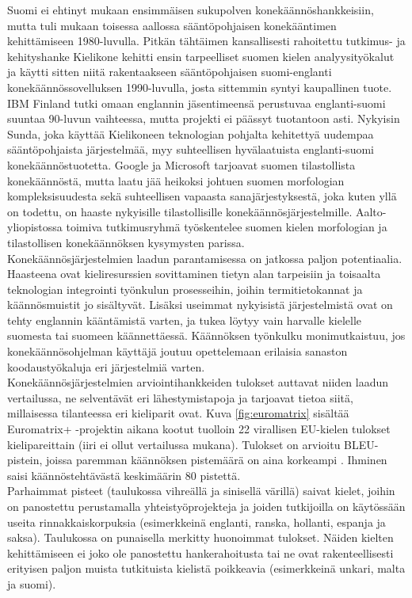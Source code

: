 \begin{multicols}{2}
Suomi ei ehtinyt mukaan ensimmäisen sukupolven konekäännöshankkeisiin,
mutta tuli mukaan toisessa aallossa sääntöpohjaisen konekääntimen
kehittämiseen 1980-luvulla. Pitkän tähtäimen kansallisesti rahoitettu
tutkimus- ja kehityshanke Kielikone kehitti ensin tarpeelliset suomen
kielen analyysityökalut ja käytti sitten niitä rakentaakseen
sääntöpohjaisen suomi-englanti konekäännössovelluksen 1990-luvulla,
josta sittemmin syntyi kaupallinen tuote. IBM Finland tutki omaan
englannin jäsentimeensä perustuvaa englanti-suomi suuntaa 90-luvun
vaihteessa, mutta projekti ei päässyt tuotantoon asti. Nykyisin Sunda,
joka käyttää Kielikoneen teknologian pohjalta kehitettyä uudempaa
sääntöpohjaista järjestelmää, myy suhteellisen hyvälaatuista
englanti-suomi konekäännöstuotetta. Google ja Microsoft tarjoavat
suomen tilastollista konekäännöstä, mutta laatu jää heikoksi johtuen
suomen morfologian kompleksisuudesta sekä suhteellisen vapaasta
sanajärjestyksestä, joka kuten yllä on todettu, on haaste nykyisille
tilastollisille konekäännösjärjestelmille. Aalto-yliopistossa toimiva
tutkimusryhmä työskentelee suomen kielen morfologian ja tilastollisen
konekäännöksen kysymysten parissa.\\
Konekäännösjärjestelmien laadun parantamisessa on jatkossa paljon
potentiaalia. Haasteena ovat kieliresurssien sovittaminen tietyn alan
tarpeisiin ja toisaalta teknologian integrointi työnkulun prosesseihin, joihin 
termitietokannat ja käännösmuistit jo sisältyvät. Lisäksi useimmat nykyisistä 
järjestelmistä ovat on tehty englannin kääntämistä varten, ja tukea
löytyy vain harvalle kielelle suomesta tai suomeen käännettäessä. Käännöksen 
työnkulku monimutkaistuu, jos konekäännösohjelman käyttäjä joutuu opettelemaan 
erilaisia sanaston koodaustyökaluja eri järjestelmiä varten.\\
Konekäännösjärjestelmien arviointihankkeiden tulokset auttavat niiden
laadun vertailussa, ne selventävät eri lähestymistapoja ja tarjoavat
tietoa siitä, millaisessa tilanteessa eri kieliparit ovat. Kuva
\ref{fig:euromatrix} sisältää Euromatrix+ -projektin aikana kootut
tuolloin 22 virallisen EU-kielen tulokset kielipareittain (iiri ei
ollut vertailussa mukana). Tulokset on arvioitu BLEU-pistein, joissa
paremman käännöksen pistemäärä on aina korkeampi \cite{BLEU}. Ihminen
saisi käännöstehtävästä keskimäärin 80 pistettä.\\
Parhaimmat pisteet (taulukossa vihreällä ja sinisellä värillä) saivat
kielet, joihin on panostettu perustamalla yhteistyöprojekteja ja
joiden tutkijoilla on käytössään useita rinnakkaiskorpuksia
(esimerkkeinä englanti, ranska, hollanti, espanja ja
saksa). Taulukossa on punaisella merkitty huonoimmat tulokset.  Näiden
kielten kehittämiseen ei joko ole panostettu hankerahoitusta tai ne
ovat rakenteellisesti erityisen paljon muista tutkituista kielistä
poikkeavia (esimerkkeinä unkari, malta ja suomi).


\end{multicols}
